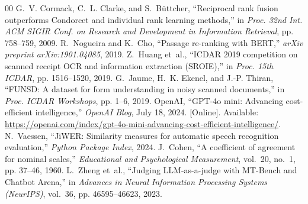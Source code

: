 \begin{thebibliography}{00}
G.~V. Cormack, C.~L. Clarke, and S.~B{\"u}ttcher, ``Reciprocal rank fusion outperforms Condorcet and individual rank learning methods,'' in \emph{Proc. 32nd Int. ACM SIGIR Conf. on Research and Development in Information Retrieval}, pp. 758--759, 2009.
R.~Nogueira and K.~Cho, ``Passage re-ranking with BERT,'' \emph{arXiv preprint arXiv:1901.04085}, 2019.
Z.~Huang et~al., ``ICDAR 2019 competition on scanned receipt OCR and information extraction (SROIE),'' in \emph{Proc. 15th ICDAR}, pp. 1516--1520, 2019.
G.~Jaume, H.~K. Ekenel, and J.-P. Thiran, ``FUNSD: A dataset for form understanding in noisy scanned documents,'' in \emph{Proc. ICDAR Workshops}, pp. 1--6, 2019.
OpenAI, ``GPT-4o mini: Advancing cost-efficient intelligence,'' \emph{OpenAI Blog}, July 18, 2024. [Online]. Available: \url{https://openai.com/index/gpt-4o-mini-advancing-cost-efficient-intelligence/}.
N.~Vaessen, ``JiWER: Similarity measures for automatic speech recognition evaluation,'' \emph{Python Package Index}, 2024.
J.~Cohen, ``A coefficient of agreement for nominal scales,'' \emph{Educational and Psychological Measurement}, vol.~20, no.~1, pp. 37--46, 1960.
L.~Zheng et~al., ``Judging LLM-as-a-judge with MT-Bench and Chatbot Arena,'' in \emph{Advances in Neural Information Processing Systems (NeurIPS)}, vol.~36, pp. 46595--46623, 2023.
\end{thebibliography}
